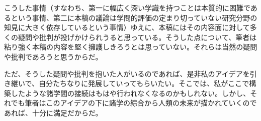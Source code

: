 こうした事情（すなわち、第一に幅広く深い学識を持つことは本質的に困難であるという事情、第二に本稿の議論は学問的評価の定まり切っていない研究分野の知見に大きく依存しているという事情）ゆえに、本稿にはその内容面に対して多くの疑問や批判が投げかけられうると思っている。そうした点について、筆者は粘り強く本稿の内容を堅く擁護しきろうとは思っていない。それらは当然の疑問や批判であろうと思うからだ。

ただ、そうした疑問や批判を抱いた人がいるのであれば、是非私のアイデアを引き継いで、自分たちなりに発展していってもらいたい。そこでは、私がここで構築したような諸学間の接続はもはや行われなくなるのかもしれない。しかし、それでも筆者はこのアイデアの下に諸学の綜合から人類の未来が描かれていくのであれば、十分に満足だからだ。
